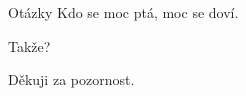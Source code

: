 \documentclass[12pt,a4paper]{beamer}
\begin{document}
	\begin{frame}{Otázky}
		Kdo se moc ptá, moc se doví.
		
		\vspace{10pt}
		
		Takže?
	\end{frame}

	\begin{frame}
	Děkuji za pozornost.
	\end{frame}
\end{document}

